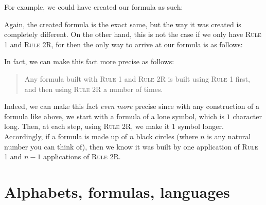 For example, we could have created our formula as such:

\medskip
\begin{axiomatic}
\end{axiomatic}
\medskip

Again, the created formula is the exact same, but the way it was created is completely different. On the other hand, this is not the case if we only have \textsc{Rule 1} and \textsc{Rule 2R}, for then the only way to arrive at our formula is as follows: 

\medskip
\begin{axiomatic}
\end{axiomatic}
\medskip

In fact, we can make this fact more precise as follows:

\begin{quote}
Any formula built with \textsc{Rule 1} and \textsc{Rule 2R} is built using \textsc{Rule 1} first, and then using \textsc{Rule 2R} a number of times. 
\end{quote}

Indeed, we can make this fact \textit{even more} precise since with any construction of a formula like above, we start with a formula of a lone symbol, which is $1$ character long. Then, at each step, using \textsc{Rule 2R}, we make it $1$ symbol longer. Accordingly, if a formula is made up of $n$ black circles (where $n$ is any natural number you can think of), then we know it was built by one application of \textsc{Rule 1} and $n-1$ applications of \textsc{Rule 2R}.


\section{Alphabets, formulas, languages}

